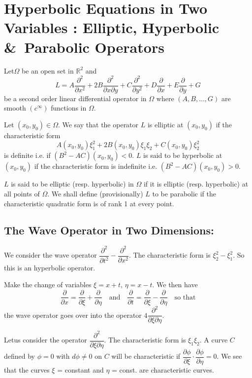 \chapter{Hyperbolic Equations in Two Variables : Elliptic, Hyperbolic \&\ Parabolic Operators}


\setcounter{pageoriginal}{0}
Let\pageoriginale $\Omega$ be an open set in $\mathbb{R}^{2}$ and
$$
L=A\frac{\partial^{2}}{\partial x^{2}}+2B\frac{\partial^{2}}{\partial x\partial y}+C\frac{\partial^{2}}{\partial y^{2}}+D\frac{\partial}{\partial x}+E\frac{\partial}{\partial y}+G
$$
be a second order linear differential operator in $\Omega$ where $(A,B,\ldots,G)$ are smooth $(c^{\infty})$ functions in $\Omega$.

\begin{defi*}
Let $(x_{0},y_{0})\in \Omega$. We say that the operator $L$ is elliptic at $(x_{0},y_{0})$ if the characteristic form
$$
A(x_{0},y_{0})\xi^{2}_{1}+2B(x_{0},y_{0})\xi_{1}\xi_{2}+C(x_{0},y_{0})\xi^{2}_{2}
$$
is definite i.e. if $(B^{2}-AC)(x_{0},y_{0})<0$. $L$ is said to be hyperbolic at $(x_{0},y_{0})$ if the characteristic form is indefinite i.e. $(B^{2}-AC)(x_{0},y_{0})>0$.
\end{defi*}

$L$ is said to be elliptic (resp. hyperbolic) in $\Omega$ if it is elliptic (resp. hyperbolic) at all points of $\Omega$. We shall define (provisionally) $L$ to be parabolic if the characteristic quadratic form is of rank 1 at every point.

\section*{The Wave Operator in Two Dimensions:}

We consider the wave operator $\dfrac{\partial^{2}}{\partial t^{2}}-\dfrac{\partial^{2}}{\partial x^{2}}$. The characteristic form is $\xi^{2}_{2}-\xi^{2}_{1}$. So this is an hyperbolic operator.

Make the change of variables $\xi=x+t$, $\eta=x-t$. We then have
$$
\frac{\partial}{\partial x}=\frac{\partial}{\partial \xi}+\frac{\partial}{\partial \eta}\quad\text{and}\quad \frac{\partial}{\partial t}=\frac{\partial}{\partial \xi}-\frac{\partial}{\partial\eta}\quad\text{so that}
$$
the wave operator goes over into the operator $4\dfrac{\partial^{2}}{\partial \xi \partial \eta}$.

Let\pageoriginale us consider the operator $\dfrac{\partial^{2}}{\partial \xi \partial \eta}$. The characteristic form is $\xi_{1}\xi_{2}$. A curve $C$ defined by $\phi=0$ with $d\phi\neq 0$ on $C$ will be characteristic if $\dfrac{\partial \phi}{\partial \xi}\cdot \dfrac{\partial \phi}{\partial \eta}=0$. We see that the curves $\xi$ = constant and $\eta$ = const. are characteristic curves.

